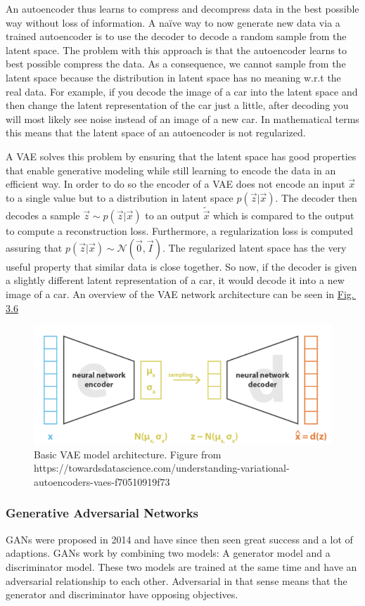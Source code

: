 An autoencoder thus learns to compress and decompress data in the best possible way without loss of information. A na\"{i}ve way to now generate new data via a trained autoencoder is to use the decoder to decode a random sample from the latent space. The problem with this approach is that the autoencoder learns to best possible compress the data. As a consequence, we cannot sample from the latent space because the distribution in latent space has no meaning w.r.t the real data. For example, if you decode the image of a car into the latent space and then change the latent representation of the car just a little, after decoding you will most likely see noise instead of an image of a new car. In mathematical terms this means that the latent space of an autoencoder is not regularized.

A VAE solves this problem by ensuring that the latent space has good properties that enable generative modeling while still learning to encode the data in an efficient way. In order to do so the encoder of a VAE does not encode an input $\vec{x}$ to a single value but to a distribution in latent space $p(\vec{z}|\vec{x})$. The decoder then decodes a sample $\vec{z}\sim p(\vec{z}|\vec{x})$ to an output $\tilde{\vec{x}}$ which is compared to the output to compute a reconstruction loss. Furthermore, a regularization loss is computed assuring that $p(\vec{z}|\vec{x})\sim\mathcal{N}(\vec{0},\vec{I})$. The regularized latent space has the very useful property that similar data is close together. So now, if the decoder is given a slightly different latent representation of a car, it would decode it into a new image of a car. An overview of the VAE network architecture can be seen in \hyperref[fig:3.6]{Fig.\,3.6}
%
\begin{figure} \label{fig:3.6}
    \centering
    \includegraphics[width=.65\textwidth]{Chapters/figures/vae.PNG}
    \caption[Basic VAE model architecture]{Basic VAE model architecture. Figure from\\
    https://towardsdatascience.com/understanding-variational-autoencoders-vaes-f70510919f73}
\end{figure}
%
\subsubsection{Generative Adversarial Networks} \label{sec:gans}
GANs were proposed in 2014 \cite{gan_original} and have since then seen great success and a lot of adaptions. GANs work by combining two models: A generator model and a discriminator model. These two models are trained at the same time and have an adversarial relationship to each other. Adversarial in that sense means that the generator and discriminator have opposing objectives. 

